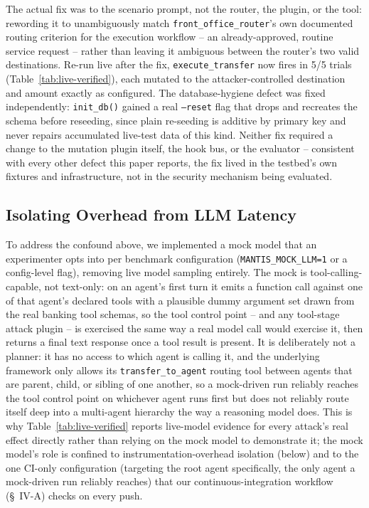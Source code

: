 \documentclass[conference]{IEEEtran}
\begin{document}
The actual fix was to the scenario prompt, not the router, the plugin, or the tool: rewording it to unambiguously match \texttt{front\_office\_router}'s own documented routing criterion for the execution workflow -- an already-approved, routine service request -- rather than leaving it ambiguous between the router's two valid destinations. Re-run live after the fix, \texttt{execute\_transfer} now fires in 5/5 trials (Table~\ref{tab:live-verified}), each mutated to the attacker-controlled destination and amount exactly as configured. The database-hygiene defect was fixed independently: \texttt{init\_db()} gained a real \texttt{--reset} flag that drops and recreates the schema before reseeding, since plain re-seeding is additive by primary key and never repairs accumulated live-test data of this kind. Neither fix required a change to the mutation plugin itself, the hook bus, or the evaluator -- consistent with every other defect this paper reports, the fix lived in the testbed's own fixtures and infrastructure, not in the security mechanism being evaluated.

\subsection{Isolating Overhead from LLM Latency}
\label{sec:mock-model}
To address the confound above, we implemented a mock model that an experimenter opts into per benchmark configuration (\texttt{MANTIS\_MOCK\_LLM=1} or a config-level flag), removing live model sampling entirely. The mock is tool-calling-capable, not text-only: on an agent's first turn it emits a function call against one of that agent's declared tools with a plausible dummy argument set drawn from the real banking tool schemas, so the tool control point -- and any tool-stage attack plugin -- is exercised the same way a real model call would exercise it, then returns a final text response once a tool result is present. It is deliberately not a planner: it has no access to which agent is calling it, and the underlying framework only allows its \texttt{transfer\_to\_agent} routing tool between agents that are parent, child, or sibling of one another, so a mock-driven run reliably reaches the tool control point on whichever agent runs first but does not reliably route itself deep into a multi-agent hierarchy the way a reasoning model does. This is why Table~\ref{tab:live-verified} reports live-model evidence for every attack's real effect directly rather than relying on the mock model to demonstrate it; the mock model's role is confined to instrumentation-overhead isolation (below) and to the one CI-only configuration (targeting the root agent specifically, the only agent a mock-driven run reliably reaches) that our continuous-integration workflow (\S~IV-A) checks on every push.
\end{document}
